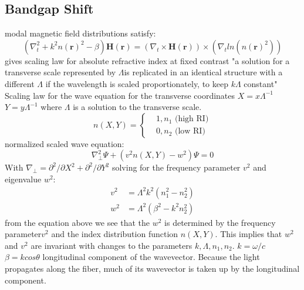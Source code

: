 \subsection{Bandgap Shift}
modal magnetic field distributions satisfy:
\begin{equation}
	(\nabla^2_t + k^2n(\boldsymbol{r})^2 - \beta)\boldsymbol{H(r)} = (\nabla_t\times\boldsymbol{H(r)})\times(\nabla_t ln(n(\boldsymbol{r})^2))
\end{equation}
gives scaling law for absolute refractive index at fixed contrast
"a solution for a transverse scale represented by $\Lambda$is replicated in an identical structure with a different $\Lambda$ if the wavelength is scaled proportionately, to keep $k\Lambda$ constant"
Scaling law for the wave equation for the transverse coordinates
$X=x\Lambda^{-1}$ $Y=y\Lambda^{-1}$
where $\Lambda$ is a solution to the transverse scale. 
\begin{equation}
	n(X, Y) = \begin{cases}
		&1, n_1 \text{   (high RI)}\\
		&0, n_2 \text{   (low RI)}
	\end{cases}
\end{equation}
normalized scaled wave equation:
\begin{equation}
	\nabla_\perp^2\Psi + (v^2n(X, Y) - w^2)\Psi = 0
\end{equation}
With $\nabla_\perp = \partial^2/\partial X^2 + \partial^2/\partial Y^2 $
solving for the frequency parameter $v^2$ and eigenvalue $w^2$:
\begin{equation}
	\begin{aligned}
		v^2  &= \Lambda^2k^2(n_1^2 - n_2^2)\\
		w^2 &= \Lambda^2(\beta^2 - k^2n_2^2)
	\end{aligned}
\end{equation}
from the equation above we see that the $w^2$ is determined by the frequency parameter$v^2$ and the index distribution function $n(X, Y)$. This implies that $w^2$ and $v^2$ are invariant with changes to the parameters $k, \Lambda, n_1, n_2$. 
$k = \omega/c$ $\beta = kcos\theta$ longitudinal component of the wavevector. Because the light propagates along the fiber, much of its wavevector is taken up by the longitudinal component. 

